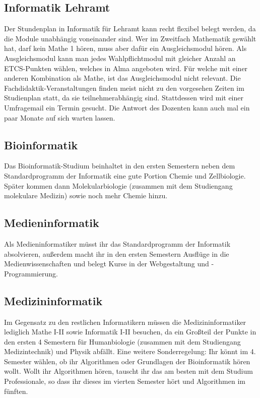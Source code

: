 \subsection*{Informatik Lehramt}
	
\pagebreak 
Der Stundenplan in Informatik für Lehramt kann recht flexibel belegt werden, da die Module unabhängig voneinander sind. Wer im Zweitfach Mathematik gewählt hat, darf kein Mathe 1 hören, muss aber dafür ein Ausgleichsmodul hören. Als Ausgleichsmodul kann man jedes Wahlpflichtmodul mit gleicher Anzahl an ETCS-Punkten wählen, welches in Alma angeboten wird. Für welche mit einer anderen Kombination als Mathe, ist das Ausgleichsmodul nicht relevant. Die Fachdidaktik-Veranstaltungen finden meist nicht zu den vorgesehen Zeiten im Studienplan statt, da sie teilnehmerabhängig sind. Stattdessen wird mit einer Umfragemail ein Termin gesucht. Die Antwort des Dozenten kann auch mal ein paar Monate auf sich warten lassen.

\subsection*{Bioinformatik}
	
Das Bioinformatik-Studium beinhaltet in den ersten Semestern neben dem Standardprogramm der Informatik eine gute Portion Chemie und Zellbiologie. Später kommen dann Molekularbiologie (zusammen mit dem Studiengang molekulare Medizin) sowie noch mehr Chemie hinzu.
\pagebreak 
\subsection*{Medieninformatik}
	
Als Medieninformatiker müsst ihr das Standardprogramm der Informatik absolvieren, außerdem macht ihr in den ersten Semestern Ausflüge in die Medienwissenschaften und belegt Kurse in der Webgestaltung und -Programmierung.
\subsection*{Medizininformatik}
	
Im Gegensatz zu den restlichen Informatikern müssen die Medizininformatiker lediglich Mathe I-II sowie Informatik I-II besuchen, da ein Großteil der Punkte in den ersten 4 Semestern für Humanbiologie (zusammen mit dem Studiengang Medizintechnik) und Physik abfällt. Eine weitere Sonderregelung: Ihr könnt im 4. Semester wählen, ob ihr Algorithmen oder Grundlagen der Bioinformatik hören wollt. Wollt ihr Algorithmen hören, tauscht ihr das am besten mit dem Studium Professionale, so dass ihr dieses im vierten Semester hört und Algorithmen im fünften.

\pagebreak